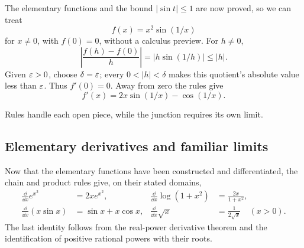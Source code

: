 \begin{example}
The elementary functions and the bound $|\sin t|\leq1$ are now proved,
so we can treat
\[
f(x)=x^2\sin(1/x)
\]
 for $x\ne0$, with $f(0)=0$,
without a calculus preview. For $h\ne0$,
\[
\left|\frac{f(h)-f(0)}h\right|=|h\sin(1/h)|\leq|h|.
\]
Given $\varepsilon>0$, choose $\delta=\varepsilon$; every $0<|h|<\delta$
makes this quotient's absolute value less than $\varepsilon$. Thus $f'(0)=0$.
Away from zero the rules give
\[
f'(x)=2x\sin(1/x)-\cos(1/x).
\]

Rules handle each open piece, while the junction requires its own limit.
\end{example}

\subsection*{Elementary derivatives and familiar limits}
Now that the elementary functions have been constructed and differentiated,
the chain and product rules give, on their stated domains,
\[
\begin{aligned}
\frac{\dd}{\dd x}e^{x^2}&=2xe^{x^2},&
\frac{\dd}{\dd x}\log(1+x^2)&=\frac{2x}{1+x^2},\\
\frac{\dd}{\dd x}(x\sin x)&=\sin x+x\cos x,&
\frac{\dd}{\dd x}\sqrt{x}&=\frac1{2\sqrt{x}}\quad(x>0).
\end{aligned}
\]
The last identity follows from the real-power derivative theorem and
the identification of positive rational powers with their roots.

